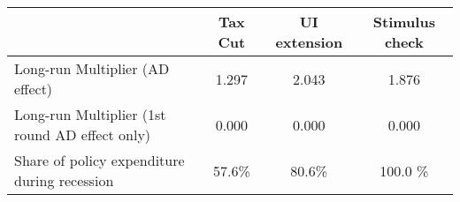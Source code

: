 \begin{tabular}{@{}lccc@{}} 
\toprule 
& Tax Cut    & UI extension    & Stimulus check    \\  \midrule 
Long-run Multiplier (AD effect) &1.297  & 2.043  & 1.876     \\ 
Long-run Multiplier (1st round AD effect only) &0.000  & 0.000  & 0.000     \\ 
Share of policy expenditure during recession &57.6\%  & 80.6\%  & 100.0 \%    \\ 
\end{tabular}  
